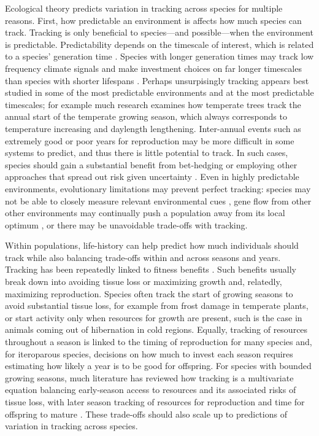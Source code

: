 \documentclass[11pt,letterpaper]{article}
\begin{document}
Ecological theory predicts variation in tracking across species for multiple reasons. First, how predictable an environment is affects how much species can track. Tracking is only beneficial to species---and possible---when the environment is predictable. Predictability depends on the timescale of interest, which is related to a species' generation time \citep[which itself should be shaped by an environment and its predictability,][]{Davison2010,morris2008}. Species with longer generation times may track low frequency climate signals and make investment choices on far longer timescales than species with shorter lifespans \citep{morris2008}. Perhaps unsurpisingly tracking appears best studied in some of the most predictable environments and at the most predictable timescales; for example much research examines how temperate trees track the annual start of the temperate growing season, which always corresponds to temperature increasing and daylength lengthening. Inter-annual events such as extremely good or poor years for reproduction may be more difficult in some systems to predict, and thus there is little potential to track. In such cases, species should gain a substantial benefit from bet-hedging or employing other approaches that spread out risk given uncertainty \citep{Venable:2007os,donald2013}. Even in highly predictable environments, evolutionary limitations may prevent perfect tracking: species may not be able to closely measure relevant environmental cues \citep{arnold1992,Singer:2010eb}, gene flow from other other environments may continually push a population away from its local optimum \citep{lenormand2002}, or there may be unavoidable trade-offs \citep{levins1968} with tracking. 

Within populations, life-history can help predict how much individuals should track while also balancing trade-offs within and across seasons and years. Tracking has been repeatedly linked to fitness benefits \citep[e.g.,][]{farzan2018,deacy2018}. Such benefits usually break down into avoiding tissue loss or maximizing growth and, relatedly, maximizing reproduction. Species often track the start of growing seasons to avoid substantial tissue loss, for example from frost damage in temperate plants, or start activity only when resources for growth are present, such is the case in animals coming out of hibernation in cold regions. Equally, tracking of resources throughout a season is linked to the timing of reproduction for many species and, for iteroparous species, decisions on how much to invest each season requires estimating how likely a year is to be good for offspring. For species with bounded growing seasons, much literature has reviewed how tracking is a multivariate equation balancing early-season access to resources and its associated risks of tissue loss, with later season tracking of resources for reproduction and time for offspring to mature \citep{donohue2002,Morin:2005ye,Burghardt2015}. These trade-offs should also scale up to predictions of variation in tracking across species. 
\end{document}
